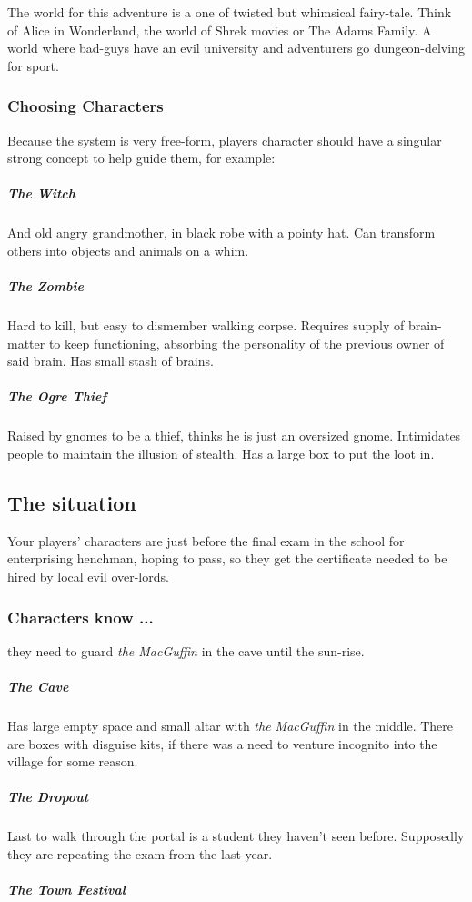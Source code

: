 \documentclass[letterpaper,twocolumn,openany,nodeprecatedcode]{dndbook}
\begin{document}
The world for this adventure is a one of twisted but whimsical fairy-tale.
Think of Alice in Wonderland, the world of Shrek movies or The Adams Family.
A world where bad-guys have an evil university and adventurers go dungeon-delving for sport.

\subsubsection{Choosing Characters}

Because the system is very free-form, players character should have a singular strong concept to help guide them,
for example:
\subparagraph{The Witch} And old angry grandmother, in black robe with a pointy hat. Can transform others into objects and animals on a whim.

\subparagraph{The Zombie} Hard to kill, but easy to dismember walking corpse. Requires supply of brain-matter to keep functioning, absorbing the personality of the previous owner of said brain. Has small stash of brains.

\subparagraph{The Ogre Thief} Raised by gnomes to be a thief, thinks he is just an oversized gnome. Intimidates people to maintain the illusion of stealth. Has a large box to put the loot in.


\subsection{The situation}

Your players' characters are just before the final exam in the school for enterprising henchman, hoping to pass,
so they get the certificate needed to be hired by local evil over-lords.

\subsubsection{Characters know ...}
they need to guard \emph{the MacGuffin} in the cave until the sun-rise.

\subparagraph{The Cave}
Has large empty space and small altar with \emph{the MacGuffin} in the middle. There are boxes with disguise kits, if there was a need to venture incognito into the village for some reason.

\subparagraph{The Dropout}
Last to walk through the portal is a student they haven't seen before. Supposedly they are repeating the exam from the last year.

\subparagraph{The Town Festival}
\end{document}

